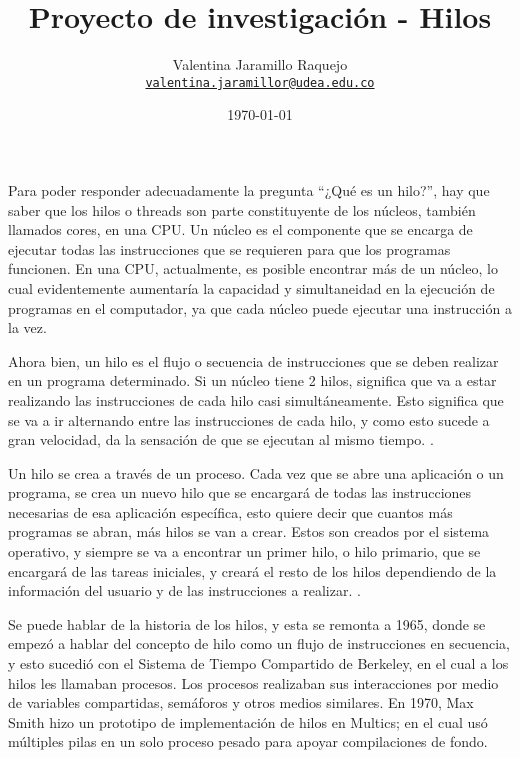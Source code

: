 \documentclass[12pt]{article}
\title{Proyecto de investigación - Hilos
}
\author{Valentina Jaramillo Raquejo\\%
    \href{mailto:valentina.jaramillor@udea.edu.co}{\texttt{valentina.jaramillor@udea.edu.co}} %
    }
\date{\today}
\begin{document}
{
\maketitle


Para poder responder adecuadamente la pregunta “¿Qué es un hilo?”, hay que saber que los hilos o threads son parte constituyente de los núcleos, también llamados cores, en una CPU. Un núcleo es el componente que se encarga de ejecutar todas las instrucciones que se requieren para que los programas funcionen. En una CPU, actualmente, es posible encontrar más de un núcleo, lo cual evidentemente aumentaría la capacidad y simultaneidad en la ejecución de programas en el computador, ya que cada núcleo puede ejecutar una instrucción a la vez. 
\newline

Ahora bien, un hilo es el flujo o secuencia de instrucciones que se deben realizar en un programa determinado. Si un núcleo tiene 2 hilos, significa que va a estar realizando las instrucciones de cada hilo casi simultáneamente. Esto significa que se va a ir alternando entre las instrucciones de cada hilo, y como esto sucede a gran velocidad, da la sensación de que se ejecutan al mismo tiempo. \citep{Defini}.
\newline

Un hilo se crea a través de un proceso. Cada vez que se abre una aplicación o un programa, se crea un nuevo hilo que se encargará de todas las instrucciones necesarias de esa aplicación específica, esto quiere decir que cuantos más programas se abran, más hilos se van a crear. Estos son creados por el sistema operativo, y siempre se va a encontrar un primer hilo, o hilo primario, que se encargará de las tareas iniciales, y creará el resto de los hilos dependiendo de la información del usuario y de las instrucciones a realizar. \citep{Hist}.
\newline

Se puede hablar de la historia de los hilos, y esta se remonta a 1965, donde se empezó a hablar del concepto de hilo como un flujo de instrucciones en secuencia, y esto sucedió con el Sistema de Tiempo Compartido de Berkeley, en el cual a los hilos les llamaban procesos.
Los procesos realizaban sus interacciones por medio de variables compartidas, semáforos y otros medios similares. En 1970, Max Smith hizo un prototipo de implementación de hilos en Multics; en el cual usó múltiples pilas en un solo proceso pesado para apoyar compilaciones de fondo.
\newline

}
\end{document}
